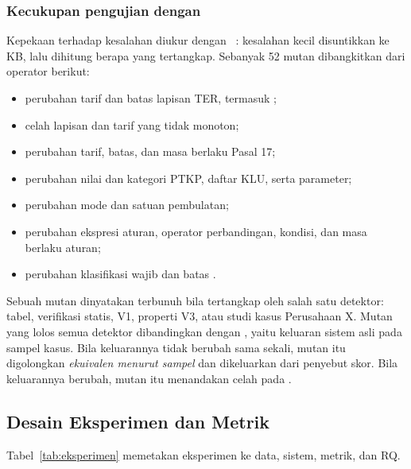 \subsubsection{Kecukupan pengujian dengan }
Kepekaan  terhadap kesalahan  diukur dengan ~\cite{petrovic2022mutation,petrovic2021mutation}: kesalahan kecil disuntikkan ke KB, lalu dihitung berapa yang tertangkap. Sebanyak 52 mutan dibangkitkan dari operator berikut:
\begin{itemize}[leftmargin=*,nosep]
  \item perubahan tarif dan batas lapisan TER, termasuk ;
  \item celah lapisan dan tarif yang tidak monoton;
  \item perubahan tarif, batas, dan masa berlaku Pasal 17;
  \item perubahan nilai dan kategori PTKP, daftar KLU, serta parameter;
  \item perubahan mode dan satuan pembulatan;
  \item perubahan ekspresi aturan, operator perbandingan, kondisi, dan masa berlaku aturan;
  \item perubahan klasifikasi wajib dan batas .
\end{itemize}
Sebuah mutan dinyatakan terbunuh bila tertangkap oleh salah satu detektor:  tabel, verifikasi statis, V1, properti V3, atau studi kasus Perusahaan X. Mutan yang lolos semua detektor dibandingkan dengan , yaitu keluaran sistem asli pada sampel kasus. Bila keluarannya tidak berubah sama sekali, mutan itu digolongkan \emph{ekuivalen menurut sampel} dan dikeluarkan dari penyebut skor. Bila keluarannya berubah, mutan itu menandakan celah pada .

\subsection{Desain Eksperimen dan Metrik}
\label{subsec:eksperimen}

Tabel~\ref{tab:eksperimen} memetakan eksperimen ke data, sistem, metrik, dan RQ.

